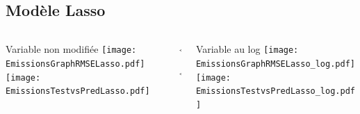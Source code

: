 \documentclass[8pt,aspectratio=169,hyperref={unicode=true}]{beamer}
\begin{document}
\subsection{Modèle Lasso}
\begin{frame}{\insertsubsection}
  \begin{columns}[t]
    \begin{column}{.33\textwidth}
      \centering Variable non modifiée
      \texttt{[image: EmissionsGraphRMSELasso.pdf]}
      \texttt{[image: EmissionsTestvsPredLasso.pdf]}
    \end{column}
    \begin{column}{.33\textwidth}
      $\Longleftarrow$
      \scriptsize
      {\centering
        }
      

      \normalsize
      $\Longleftarrow$

      \raggedleft{$\Longrightarrow$}
      \scriptsize
      {\centering
        }
      

      \normalsize
      \raggedleft{$\Longrightarrow$}
    \end{column}
    \begin{column}{.33\textwidth}
      \centering Variable au log
      \texttt{[image: EmissionsGraphRMSELasso\_log.pdf]}
      \texttt{[image: EmissionsTestvsPredLasso\_log.pdf]}
    \end{column}
  \end{columns}
\end{frame}
\end{document}
